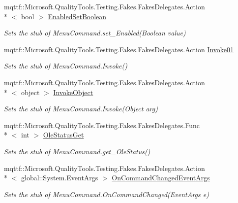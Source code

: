 \begin{DoxyCompactItemize}
mqttf\-::\-Microsoft.\-Quality\-Tools.\-Testing.\-Fakes.\-Fakes\-Delegates.\-Action\\*
$<$ bool $>$ \hyperlink{class_system_1_1_component_model_1_1_design_1_1_fakes_1_1_stub_designer_verb_afb9c7950629289a60a161f16abe85e62}{Enabled\-Set\-Boolean}
\begin{DoxyCompactList}\small\item\em Sets the stub of Menu\-Command.\-set\-\_\-\-Enabled(\-Boolean value)\end{DoxyCompactList}\item 
mqttf\-::\-Microsoft.\-Quality\-Tools.\-Testing.\-Fakes.\-Fakes\-Delegates.\-Action \hyperlink{class_system_1_1_component_model_1_1_design_1_1_fakes_1_1_stub_designer_verb_a16f465857c56a9f9c2de2e7a9365ad41}{Invoke01}
\begin{DoxyCompactList}\small\item\em Sets the stub of Menu\-Command.\-Invoke()\end{DoxyCompactList}\item 
mqttf\-::\-Microsoft.\-Quality\-Tools.\-Testing.\-Fakes.\-Fakes\-Delegates.\-Action\\*
$<$ object $>$ \hyperlink{class_system_1_1_component_model_1_1_design_1_1_fakes_1_1_stub_designer_verb_a8c503fa1267fc5de3561794f43259d12}{Invoke\-Object}
\begin{DoxyCompactList}\small\item\em Sets the stub of Menu\-Command.\-Invoke(\-Object arg)\end{DoxyCompactList}\item 
mqttf\-::\-Microsoft.\-Quality\-Tools.\-Testing.\-Fakes.\-Fakes\-Delegates.\-Func\\*
$<$ int $>$ \hyperlink{class_system_1_1_component_model_1_1_design_1_1_fakes_1_1_stub_designer_verb_a98802455259eb5bb2a1ce7b7ab156b9e}{Ole\-Status\-Get}
\begin{DoxyCompactList}\small\item\em Sets the stub of Menu\-Command.\-get\-\_\-\-Ole\-Status()\end{DoxyCompactList}\item 
mqttf\-::\-Microsoft.\-Quality\-Tools.\-Testing.\-Fakes.\-Fakes\-Delegates.\-Action\\*
$<$ global\-::\-System.\-Event\-Args $>$ \hyperlink{class_system_1_1_component_model_1_1_design_1_1_fakes_1_1_stub_designer_verb_a5fd75378924f9408acd78501d01c6a68}{On\-Command\-Changed\-Event\-Args}
\begin{DoxyCompactList}\small\item\em Sets the stub of Menu\-Command.\-On\-Command\-Changed(\-Event\-Args e)\end{DoxyCompactList}\item 

\end{DoxyCompactItemize}
